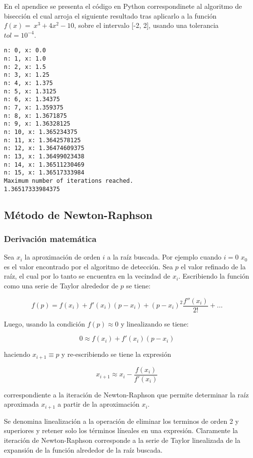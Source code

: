 En el apendice se presenta el código en Python correspondinete al algoritmo de bisección el cual arroja el siguiente resultado tras aplicarlo a la función $f (x) = \ x^3 + 4x^2 - 10$, sobre el intervalo [-2, 2], usando una tolerancia $tol = 10^{-4}$.

\begin{verbatim}
n: 0, x: 0.0
n: 1, x: 1.0
n: 2, x: 1.5
n: 3, x: 1.25
n: 4, x: 1.375
n: 5, x: 1.3125
n: 6, x: 1.34375
n: 7, x: 1.359375
n: 8, x: 1.3671875
n: 9, x: 1.36328125
n: 10, x: 1.365234375
n: 11, x: 1.3642578125
n: 12, x: 1.36474609375
n: 13, x: 1.36499023438
n: 14, x: 1.36511230469
n: 15, x: 1.36517333984
Maximum number of iterations reached.
1.36517333984375
\end{verbatim}

\subsection{Método de Newton-Raphson}
\subsubsection*{Derivación matemática}
Sea $x_i$ la aproximación de orden $i$ a la raíz buscada. Por ejemplo cuando $i=0$ $x_0$ es el valor encontrado por el algoritmo de detección. Sea $p$ el valor refinado de la raíz, el cual por lo tanto se encuentra en la vecindad de $x_i$. Escribiendo la función como una serie de Taylor alrededor de $p$ se tiene:


\[f(p)=f(x_i)+f'(x_i)(p-x_i)+{(p-x_i)}^2\frac{f''(x_i)}{2!}+...\]

Luego, usando la condición $f(p)\approx0$ y linealizando se tiene:

\[ 0\approx f(x_i)+f'(x_i)(p-x_i) \]

haciendo $x_{i+1}\equiv p$ y re-escribiendo se tiene la expresión

\[
x_{i+1}\approx x_i-\frac{f(x_i)}{f'(x_i)}
\]

correspondiente a la iteración de Newton-Raphson que permite determinar la raíz aproximada  $x_{i+1}$ a partir de la aproximación $x_i$.

\begin{tcolorbox}
Se denomina linealización a la operación de eliminar los terminos de orden 2 y superiores y retener solo los términos líneales en una expresión. Claramente la iteración de Newton-Raphson corresponde a la serie de Taylor linealizada de la expansión de la función alrededor de la raíz buscada.
\end{tcolorbox}

